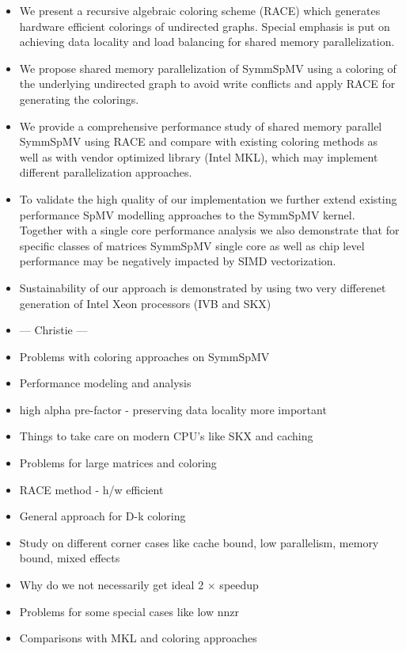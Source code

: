 
\begin{itemize}
\item We present a recursive algebraic coloring scheme (RACE) which generates hardware efficient \DK colorings of undirected graphs. Special emphasis is put on achieving data locality and load balancing for shared memory parallelization.
\item We propose shared memory parallelization of \acrshort{SymmSpMV}  using a \DTWO coloring of the underlying undirected graph to avoid write conflicts and apply RACE for generating the colorings.
\item We provide a comprehensive performance study of shared memory parallel \acrshort{SymmSpMV} using RACE and compare with existing coloring methods as well as with vendor optimized library (Intel MKL), which may implement different parallelization approaches.
\item To validate the high quality of our implementation we further extend existing performance \acrshort{SpMV} modelling approaches to the \acrshort{SymmSpMV} kernel. Together with a single core performance analysis we also demonstrate that for specific classes of matrices  \acrshort{SymmSpMV}  single core as well as chip level performance may be negatively impacted by SIMD vectorization.
\item  Sustainability of our approach is demonstrated by using two very differenet generation of Intel Xeon processors (IVB and SKX)
\item --- Christie ---
	\item Problems with coloring approaches on SymmSpMV
	\item Performance modeling and analysis
	\item high alpha pre-factor - preserving data locality more important
	\item Things to take care on modern CPU's like SKX and caching
	\item Problems for large matrices and coloring
	\item RACE method - h/w efficient 
	\item General approach for D-k coloring
	\item Study on different corner cases like cache bound, low parallelism, memory bound, mixed effects 
	\item Why do we not necessarily get ideal 2 $\times$ speedup
	\item Problems for some special cases like low nnzr
	\item Comparisons with MKL and coloring approaches
\end{itemize}
